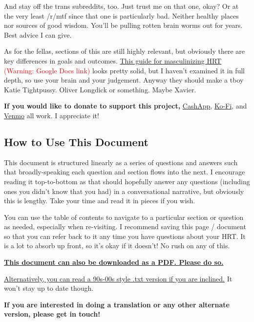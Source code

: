 \documentclass{article}
\begin{document}
And stay off the trans subreddits, too. Just trust me on that one, okay? Or at the very least /r/mtf since that one is particularly bad. Neither healthy places nor sources of good wisdom. You’ll be pulling rotten brain worms out for years. Best advice I can give.

As for the fellas, sections of this are still highly relevant, but obviously there are key differences in goals and outcomes. \href{https://docs.google.com/document/d/1DXFxzN0XTudPZez\_SO61fpqncRLPH\_Be\_QG\_8Pcz9LU/edit?tab=t.0}{This guide for masculinizing HRT} \textcolor{red}{(Warning: Google Docs link)} looks pretty solid, but I haven’t examined it in full depth, so use your brain and your judgement. Anyway they should make a tboy Katie Tightpussy. Oliver Longdick or something. Maybe Xavier.

\textbf{If you would like to donate to support this project,} \href{https://cash.app/Katitties}{CashApp}, \href{https://ko-fi.com/katitties}{Ko-Fi}, and \href{https://account.venmo.com/u/katitties}{Venmo} all work. I appreciate it!

\subsection*{How to Use This Document}

This document is structured linearly as a series of questions and answers such that broadly-speaking each question and section flows into the next. I encourage reading it top-to-bottom as that should hopefully answer any questions (including ones you didn’t know that you had) in a conversational narrative, but obviously this is lengthy. Take your time and read it in pieces if you wish.

You can use the table of contents to navigate to a particular section or question as needed, especially when re-visiting. I recommend saving this page / document so that you can refer back to it any time you have questions about your HRT. It is a lot to absorb up front, so it’s okay if it doesn’t! No rush on any of this.

\noindent\textbf{\href{pghrt.pdf}{This document can also be downloaded as a PDF. Please do so.}}

\noindent\href{pghrtgretchensversion.txt}{Alternatively, you can read a 90s-00s style .txt version if you are inclined.} It won't stay up to date though.

\noindent\textbf{If you are interested in doing a translation or any other alternate version, please get in touch!}
\end{document}
